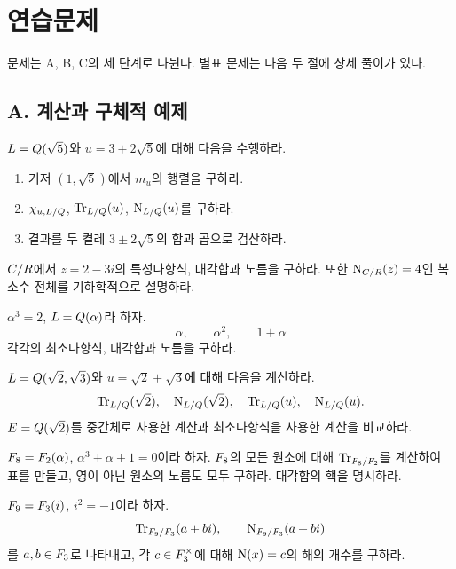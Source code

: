\clearpage
\section{연습문제}
\label{sec:norm-trace-exercises}

문제는 A, B, C의 세 단계로 나뉜다. 별표 문제는 다음 두 절에 상세 풀이가 있다.

\subsection*{A. 계산과 구체적 예제}

\begin{exercise}[*]
$L=Q(\sqrt5)$와 $u=3+2\sqrt5$에 대해 다음을 수행하라.
\begin{enumerate}[label=(\alph*)]
  \item 기저 $(1,\sqrt5)$에서 $m_u$의 행렬을 구하라.
  \item $\chi_{u,L/Q}$, $\operatorname{Tr}_{L/Q}(u)$, $\operatorname{N}_{L/Q}(u)$를 구하라.
  \item 결과를 두 켤레 $3\pm2\sqrt5$의 합과 곱으로 검산하라.
\end{enumerate}
\end{exercise}

\begin{exercise}
$C/R$에서 $z=2-3i$의 특성다항식, 대각합과 노름을 구하라.
또한 $\operatorname{N}_{C/R}(z)=4$인 복소수 전체를 기하학적으로 설명하라.
\end{exercise}

\begin{exercise}[*]
$\alpha^3=2$, $L=Q(\alpha)$라 하자.
\[
  \alpha,\qquad \alpha^2,\qquad 1+\alpha
\]
각각의 최소다항식, 대각합과 노름을 구하라.
\end{exercise}

\begin{exercise}[*]
$L=Q(\sqrt2,\sqrt3)$와 $u=\sqrt2+\sqrt3$에 대해 다음을 계산하라.
\[
  \operatorname{Tr}_{L/Q}(\sqrt2),\quad
  \operatorname{N}_{L/Q}(\sqrt2),\quad
  \operatorname{Tr}_{L/Q}(u),\quad
  \operatorname{N}_{L/Q}(u).
\]
$E=Q(\sqrt2)$를 중간체로 사용한 계산과 최소다항식을 사용한 계산을 비교하라.
\end{exercise}

\begin{exercise}[*]
$F_8=F_2(\alpha)$, $\alpha^3+\alpha+1=0$이라 하자.
$F_8$의 모든 원소에 대해 $\operatorname{Tr}_{F_8/F_2}$를 계산하여 표를 만들고,
영이 아닌 원소의 노름도 모두 구하라. 대각합의 핵을 명시하라.
\end{exercise}

\begin{exercise}
$F_9=F_3(i)$, $i^2=-1$이라 하자.
\[
  \operatorname{Tr}_{F_9/F_3}(a+bi),\qquad
  \operatorname{N}_{F_9/F_3}(a+bi)
\]
를 $a,b\in F_3$로 나타내고, 각 $c\in F_3^\times$에 대해
$\operatorname{N}(x)=c$의 해의 개수를 구하라.
\end{exercise}

